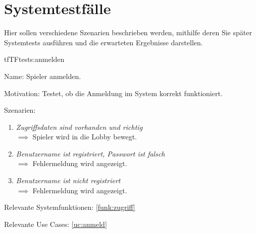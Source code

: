 \chapter{Systemtestfälle}

Hier sollen verschiedene Szenarien beschrieben werden, mithilfe deren Sie später Systemtests ausführen und die erwarteten Ergebnisse darstellen.

\setcounter{tf}{10}

\begin{description}[leftmargin=5em, style=sameline]

\begin{lhp}{tf}{TF}{tests:anmelden}
	\item [Name:] Spieler anmelden.
	\item [Motivation:] Testet, ob die Anmeldung im System korrekt funktioniert.
	\item [Szenarien:] \hfill
		\begin{enumerate}
			\item \textit{Zugriffsdaten sind vorhanden und richtig} \\ $\implies$ Spieler wird in die Lobby bewegt.
			\item \textit{Benutzername ist registriert, Passwort ist falsch} \\ $\implies$ Fehlermeldung wird angezeigt.
			\item \textit{Benutzername ist nicht registriert} \\ $\implies$ Fehlermeldung wird angezeigt.
		\end{enumerate}
	\item [Relevante Systemfunktionen:] \ref{funk:zugriff}
	\item [Relevante Use Cases:] \ref{uc:anmeld}
\end{lhp}

\end{description}

